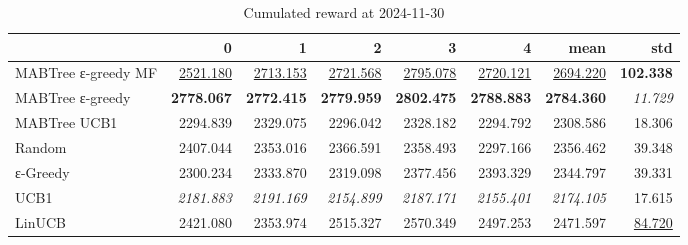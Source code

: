 \begin{table}
\caption{Cumulated reward at 2024-11-30}
\begin{tabular}{lrrrrrrr}
\toprule
 & 0 & 1 & 2 & 3 & 4 & mean & std \\
\midrule
MABTree ε-greedy MF & \underline{2521.180} & \underline{2713.153} & \underline{2721.568} & \underline{2795.078} & \underline{2720.121} & \underline{2694.220} & \textbf{102.338} \\
MABTree ε-greedy & \textbf{2778.067} & \textbf{2772.415} & \textbf{2779.959} & \textbf{2802.475} & \textbf{2788.883} & \textbf{2784.360} & \textit{11.729} \\
MABTree UCB1 & 2294.839 & 2329.075 & 2296.042 & 2328.182 & 2294.792 & 2308.586 & 18.306 \\
Random & 2407.044 & 2353.016 & 2366.591 & 2358.493 & 2297.166 & 2356.462 & 39.348 \\
ε-Greedy & 2300.234 & 2333.870 & 2319.098 & 2377.456 & 2393.329 & 2344.797 & 39.331 \\
UCB1 & \textit{2181.883} & \textit{2191.169} & \textit{2154.899} & \textit{2187.171} & \textit{2155.401} & \textit{2174.105} & 17.615 \\
LinUCB & 2421.080 & 2353.974 & 2515.327 & 2570.349 & 2497.253 & 2471.597 & \underline{84.720} \\
\bottomrule
\end{tabular}
\end{table}
